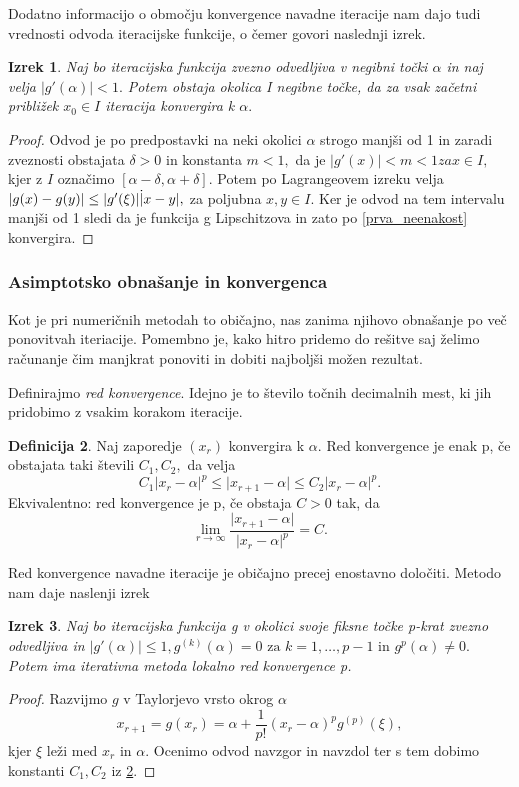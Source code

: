 \documentclass[12pt,a4paper]{amsart}
\theoremstyle{definition} %
\newtheorem{definicija}{Definicija}[section]
\theoremstyle{plain} %
\newtheorem{izrek}[definicija]{Izrek}
\begin{document}
Dodatno informacijo o območju konvergence navadne iteracije nam dajo tudi vrednosti odvoda iteracijske funkcije, o čemer govori naslednji izrek.
\begin{izrek}
    Naj bo iteracijska funkcija zvezno odvedljiva v negibni točki $\alpha$ in naj velja $\lvert g'(\alpha) \rvert < 1.$ Potem obstaja okolica I negibne točke,
    da za vsak začetni približek $x_{0} \in I$ iteracija konvergira k $\alpha.$
\end{izrek}
\begin{proof}
    Odvod je po predpostavki na neki okolici $\alpha$ strogo manjši od 1 in zaradi zveznosti obstajata $\delta > 0$ in konstanta $m < 1,$ da je $\lvert g'(x) \rvert < m < 1 za x \in I,$
    kjer z $I$ označimo $[\alpha - \delta,\alpha + \delta ].$ Potem po Lagrangeovem izreku velja $\lvert g(x) - g(y) \rvert \leq \lvert g'(\xi) \rvert \dot \lvert x - y \rvert,$
    za poljubna $x,y \in I.$ Ker je odvod na tem intervalu manjši od 1 sledi da je funkcija g Lipschitzova in zato po \eqref{prva_neenakost} konvergira.
\end{proof}

\subsubsection{Asimptotsko obnašanje in konvergenca}
Kot je pri numeričnih metodah to običajno, nas zanima njihovo obnašanje po več ponovitvah iteriacije. Pomembno je, kako hitro pridemo do rešitve saj želimo računanje čim manjkrat
ponoviti in dobiti najboljši možen rezultat.

Definirajmo \textit{red konvergence}. Idejno je to število točnih decimalnih mest, ki jih pridobimo z vsakim korakom iteracije. 
\begin{definicija}\label{red_konv}
    Naj zaporedje $(x_{r})$ konvergira k $\alpha.$ Red konvergence je enak p, če obstajata taki števili $C_{1}, C_{2},$ da velja
    \[
        C_{1}\lvert x_{r} - \alpha \rvert ^{p} \leq \lvert x_{r+1} - \alpha \rvert \leq C_{2} \lvert x_{r} - \alpha \rvert^{p}.
    \]
    Ekvivalentno: red konvergence je p, če obstaja $C > 0$ tak, da
    \[
        \lim_{r\to\infty} \frac{\lvert x_{r+1} - \alpha\rvert}{\lvert x_{r} - \alpha\rvert^{p}} = C.
    \]
\end{definicija}

Red konvergence navadne iteracije je običajno precej enostavno določiti. Metodo nam daje naslenji izrek
\begin{izrek}
    Naj bo iteracijska funkcija g v okolici svoje fiksne točke p-krat zvezno odvedljiva in $\lvert g'(\alpha) \rvert \leq 1, g^{(k)}(\alpha) = 0\text{ za }k = 1,\ldots,p-1 \text{ in }
    g^{p}(\alpha) \neq 0.$ Potem ima iterativna metoda lokalno red konvergence p.
\end{izrek}
\begin{proof}
    Razvijmo $g$ v Taylorjevo vrsto okrog $\alpha$
    \[
        x_{r+1} = g(x_{r}) = \alpha + \frac{1}{p!}(x_{r} - \alpha)^{p}g^{(p)}(\xi),
    \]
    kjer $\xi$ leži med $x_{r}$ in $\alpha.$ Ocenimo odvod navzgor in navzdol ter s tem dobimo konstanti $C_{1},C_{2}$ iz \ref{red_konv}.
\end{proof}
\end{document}
